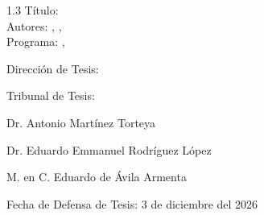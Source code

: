 
\begin{spacing}{1.3}
Título: \thesisTitle \\
Autores: \thesisAuthorA, \thesisAuthorB, \thesisAuthorC\\
Programa:	\LicProgramA, \LicProgramB
\end{spacing}
Dirección de Tesis: 
\begin{mydescription}
    \item \AsesorDetalles  
\end{mydescription}

\vspace{30 mm}

Tribunal de Tesis: 
\begin{mydescription}
    \item Dr. Antonio Martínez Torteya 
    \item Dr. Eduardo Emmanuel Rodríguez López
    \item M. en C. Eduardo de Ávila Armenta
\end{mydescription}

\vspace{30mm}



Fecha de Defensa de Tesis: 3 de diciembre del 2026



\vspace{\fill}

